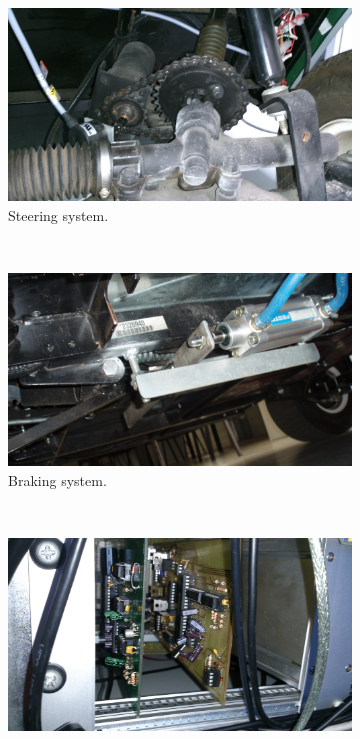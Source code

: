 \begin{figure}[h!]
        \centering
        \begin{subfigure}[b]{0.24\textwidth}
                \centering
                \includegraphics[width=\textwidth]{steering}
                \caption{Steering system.}\label{fig:cp00_steering}
        \end{subfigure}%
        ~ %
        \begin{subfigure}[b]{0.24\textwidth}
                \centering
                \includegraphics[width=\textwidth]{braking}
		\caption{Braking system.}\label{fig:cp00_brake}
        \end{subfigure}%
        ~ %
        \begin{subfigure}[b]{0.24\textwidth}
                \centering
                \includegraphics[width=\textwidth]{speed}

\end{subfigure}
\end{figure}
